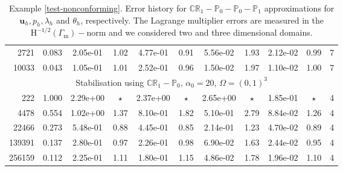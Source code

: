 \documentclass[onefignum,onetabnum,reqno,a4paper,final]{siamart250211}
\newcommand\bu{\boldsymbol{u}}
\newcommand\0{\mathbf{0}}
\renewcommand\H{\mathrm{H}}
\newcommand\Gm{\Gamma_{\mathrm{m}}}
\numberwithin{figure}{section}
\numberwithin{table}{section}
\begin{document}
\begin{table}[t!]
{\begin{tabular}{|rcccccccccc|}
  2721 & 0.083 & 2.05e-01 & 1.02 & 4.77e-01 & 0.91 & 5.56e-02 & 1.93 & 2.12e-02 & 0.99 &  7 \\
 10033 & 0.043 & 1.05e-01 & 1.01 & 2.52e-01 & 0.96 & 1.50e-02 & 1.97 & 1.10e-02 & 1.00 &  7 \\
    \hline 
            \multicolumn{11}{|c|}{Stabilisation using $\mathbb{CR}_1-\mathbb{P}_0,\,\alpha_0=20$, $\Omega=(0,1)^3$} \\
            \hline
222 & 1.000 & 2.29e+00 & $\star$ & 2.37e+00 & $\star$ & 2.65e+00 & $\star$ & 1.85e-01 & $\star$ &  4 \\
  4478 & 0.554 & 1.02e+00 & 1.37 & 8.10e-01 & 1.82 & 5.10e-01 & 2.79 & 8.84e-02 & 1.26 &  4 \\
 22466 & 0.273 & 5.48e-01 & 0.88 & 4.45e-01 & 0.85 & 2.14e-01 & 1.23 & 4.70e-02 & 0.89 &  4 \\
139391 & 0.137 & 2.80e-01 & 0.97 & 2.26e-01 & 0.98 & 6.90e-02 & 1.63 & 2.44e-02 & 0.95 &  4 \\
256159 & 0.112 & 2.25e-01 & 1.11 & 1.80e-01 & 1.15 & 4.86e-02 & 1.78 & 1.96e-02 & 1.10 &  4 \\

            \hline 
            \hline
    \end{tabular}}
    \smallskip
    \caption{Example \ref{test-nonconforming}. 
    Error history for  $\mathbb{CR}_1- \mathbb{P}_0- \mathbb{P}_0- \mathbb{P}_1$  approximations  for $\bu_h, p_h,\lambda_h$ and $\theta_h$, respectively. The Lagrange multiplier errors are measured in the $\H^{-1/2}(\Gm)-$norm and we considered two and three dimensional domains.}
    \label{tables-13to16}
\end{table}
\end{document}
